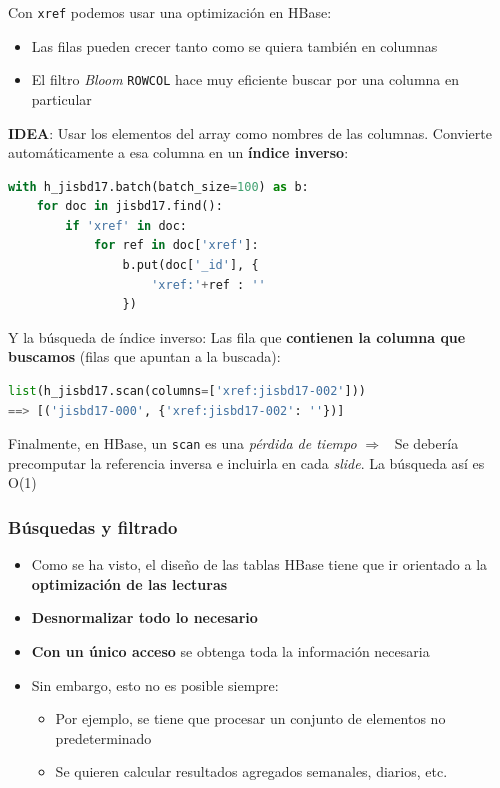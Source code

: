 \documentclass[14pt]{beamer}
\newcommand{\ra}{{\color{blue} $\Rightarrow${}~{}}}
\begin{document}
\begin{frame}
\begin{itemize}
\begin{frame}
\framebreak

Con {\tt xref} podemos usar una optimización en HBase:

\begin{itemize}
\item Las filas pueden crecer tanto como se quiera también en columnas
\item El filtro {\em Bloom} {\tt ROWCOL} hace muy eficiente buscar por una
  columna en particular
\end{itemize}

{\bf IDEA}: Usar los elementos del array como nombres de las columnas.
Convierte automáticamente a esa columna en un {\bf índice inverso}:

\framebreak

\begin{lstlisting}[language=python]
with h_jisbd17.batch(batch_size=100) as b:
    for doc in jisbd17.find():
        if 'xref' in doc:
            for ref in doc['xref']:
                b.put(doc['_id'], {
                    'xref:'+ref : ''
                })
\end{lstlisting}

Y la búsqueda de índice inverso: Las fila que {\bf contienen la
  columna que buscamos} (filas que apuntan a la buscada):

\begin{lstlisting}[language=python]
list(h_jisbd17.scan(columns=['xref:jisbd17-002']))
==> [('jisbd17-000', {'xref:jisbd17-002': ''})]
\end{lstlisting}

Finalmente, en HBase, un {\tt scan} es una {\em pérdida de tiempo} \ra{} Se
debería precomputar la referencia inversa e incluirla en cada {\em slide}.
La búsqueda así es O(1)

\end{frame}

\begin{frame}[allowframebreaks]
  \frametitle{Búsquedas y filtrado}
\begin{itemize}
\item Como se ha visto, el diseño de las tablas HBase tiene que ir
  orientado a la {\bf optimización de las lecturas}
\item {\bf Desnormalizar todo lo necesario}
\item {\bf Con un único acceso} se obtenga toda la información necesaria
\item Sin embargo, esto no es posible siempre:
  \begin{itemize}
  \item Por ejemplo, se tiene que procesar un conjunto de elementos no
    predeterminado
  \item Se quieren calcular resultados agregados semanales, diarios, etc.
  \end{itemize}


\end{itemize}
\end{frame}
\end{itemize}
\end{frame}
\end{document}
